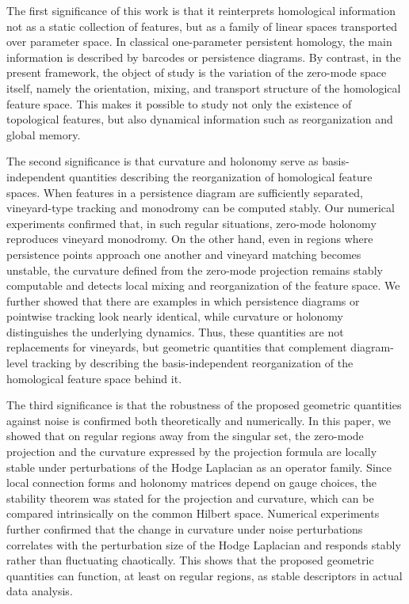 \documentclass[pdflatex,sn-mathphys-num]{sn-jnl}%
\theoremstyle{thmstyleone}%
\theoremstyle{thmstyletwo}%
\theoremstyle{thmstylethree}%
\begin{document}
The first significance of this work is that it reinterprets homological information not as a static collection of features, but as a family of linear spaces transported over parameter space. In classical one-parameter persistent homology, the main information is described by barcodes or persistence diagrams. By contrast, in the present framework, the object of study is the variation of the zero-mode space itself, namely the orientation, mixing, and transport structure of the homological feature space. This makes it possible to study not only the existence of topological features, but also dynamical information such as reorganization and global memory.

The second significance is that curvature and holonomy serve as basis-independent quantities describing the reorganization of homological feature spaces. When features in a persistence diagram are sufficiently separated, vineyard-type tracking and monodromy can be computed stably. Our numerical experiments confirmed that, in such regular situations, zero-mode holonomy reproduces vineyard monodromy. On the other hand, even in regions where persistence points approach one another and vineyard matching becomes unstable, the curvature defined from the zero-mode projection remains stably computable and detects local mixing and reorganization of the feature space. We further showed that there are examples in which persistence diagrams or pointwise tracking look nearly identical, while curvature or holonomy distinguishes the underlying dynamics. Thus, these quantities are not replacements for vineyards, but geometric quantities that complement diagram-level tracking by describing the basis-independent reorganization of the homological feature space behind it.

The third significance is that the robustness of the proposed geometric quantities against noise is confirmed both theoretically and numerically. In this paper, we showed that on regular regions away from the singular set, the zero-mode projection and the curvature expressed by the projection formula are locally stable under perturbations of the Hodge Laplacian as an operator family. Since local connection forms and holonomy matrices depend on gauge choices, the stability theorem was stated for the projection and curvature, which can be compared intrinsically on the common Hilbert space. Numerical experiments further confirmed that the change in curvature under noise perturbations correlates with the perturbation size of the Hodge Laplacian and responds stably rather than fluctuating chaotically. This shows that the proposed geometric quantities can function, at least on regular regions, as stable descriptors in actual data analysis.
\end{document}
